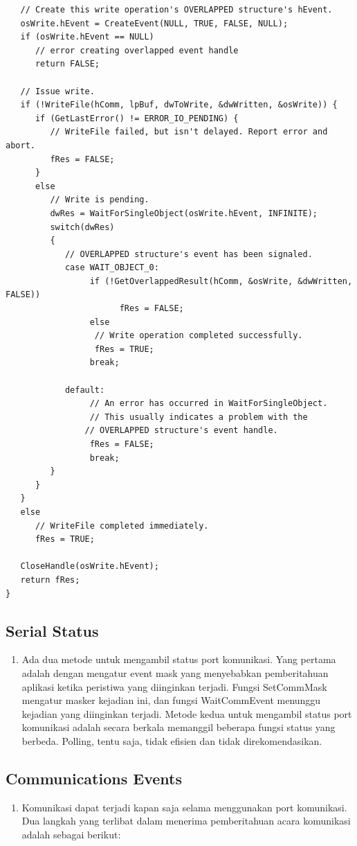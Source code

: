 \begin{enumerate}
\begin{verbatim}
   // Create this write operation's OVERLAPPED structure's hEvent.
   osWrite.hEvent = CreateEvent(NULL, TRUE, FALSE, NULL);
   if (osWrite.hEvent == NULL)
      // error creating overlapped event handle
      return FALSE;

   // Issue write.
   if (!WriteFile(hComm, lpBuf, dwToWrite, &dwWritten, &osWrite)) {
      if (GetLastError() != ERROR_IO_PENDING) { 
         // WriteFile failed, but isn't delayed. Report error and abort.
         fRes = FALSE;
      }
      else
         // Write is pending.
         dwRes = WaitForSingleObject(osWrite.hEvent, INFINITE);
         switch(dwRes)
         {
            // OVERLAPPED structure's event has been signaled. 
            case WAIT_OBJECT_0:
                 if (!GetOverlappedResult(hComm, &osWrite, &dwWritten, FALSE))
                       fRes = FALSE;
                 else
                  // Write operation completed successfully.
                  fRes = TRUE;
                 break;
            
            default:
                 // An error has occurred in WaitForSingleObject.
                 // This usually indicates a problem with the
                // OVERLAPPED structure's event handle.
                 fRes = FALSE;
                 break;
         }
      }
   }
   else
      // WriteFile completed immediately.
      fRes = TRUE;

   CloseHandle(osWrite.hEvent);
   return fRes;
}
\end{verbatim}	

	\subsection{Serial Status}
		\begin{enumerate}
			\item Ada dua metode untuk mengambil status port komunikasi. Yang pertama adalah dengan mengatur event mask yang menyebabkan pemberitahuan aplikasi ketika peristiwa yang diinginkan terjadi. Fungsi SetCommMask mengatur masker kejadian ini, dan fungsi WaitCommEvent menunggu kejadian yang diinginkan terjadi. Metode kedua untuk mengambil status port komunikasi adalah secara berkala memanggil beberapa fungsi status yang berbeda. Polling, tentu saja, tidak efisien dan tidak direkomendasikan.
		\end{enumerate}
			\subsection{Communications Events}
				\begin{enumerate}
				\item Komunikasi dapat terjadi kapan saja selama menggunakan port komunikasi. Dua langkah yang terlibat dalam menerima pemberitahuan acara komunikasi adalah sebagai berikut:


\end{enumerate}
\end{enumerate}

